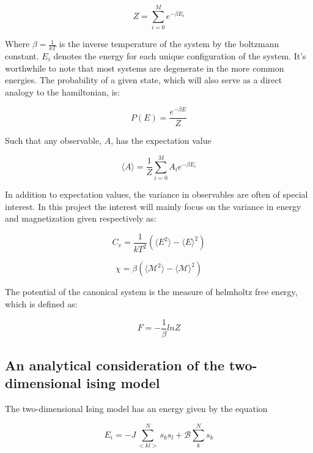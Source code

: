 \documentclass[12pt]{article}
\begin{document}
\begin{equation}
Z = \sum ^M _{i = 0}  e^{-\beta E_i}
\end{equation}

\noindent Where $\beta = \frac{1}{kT}$ is the inverse temperature of the system by the boltzmann constant. $E_i$ denotes the energy for each unique configuration of the system. It's worthwhile to note that most systems are degenerate in the more common energies. The probability of a given state, which will also serve as a direct analogy to the hamiltonian, is:

\begin{equation}
P(E) = \frac{e^{-\beta E}}{Z}
\end{equation}

\noindent Such that any observable, $A$, has the expectation value 

\begin{equation}
\langle A \rangle = \frac{1}{Z}\sum ^M _{i = 0} A_i e^{- \beta E_i}
\end{equation}

\noindent In addition to expectation values, the variance in observables are often of special interest. In this project the interest will mainly focus on the variance in energy and magnetization given respectively as: 

\begin{equation}
C_v = \frac{1}{kT^2}(\langle E^2 \rangle - \langle E \rangle ^2)
\end{equation}

\begin{equation}\label{eq:chi}
\chi = \beta(\langle \mathscr{M} ^ 2 \rangle - \langle \mathscr{M} \rangle ^2)
\end{equation}


\noindent The potential of the canonical system is the measure of helmholtz free energy, which is defined as:

\begin{equation}
F  = - \frac{1}{\beta} ln Z
\end{equation}

\subsection{An analytical consideration of the two-dimensional ising model}
The two-dimensional Ising model has an energy given by the equation 

\begin{equation}\label{eq:is_ener}
E_i = -J \sum _{<kl>}^N s_k s_l + \mathscr{B} \sum ^N _k s_k 
\end{equation}
\end{document}
